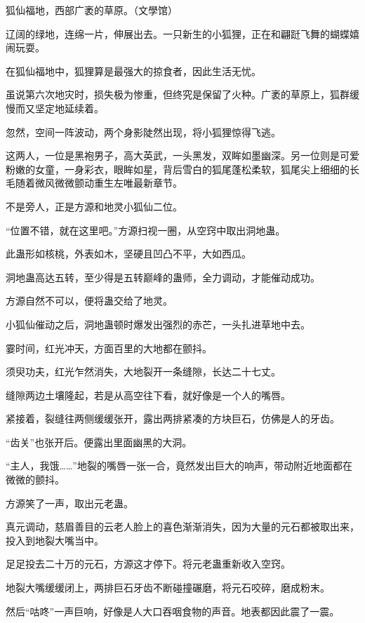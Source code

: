 
\begin{this_body}

狐仙福地，西部广袤的草原。（文學馆）

辽阔的绿地，连绵一片，伸展出去。一只新生的小狐狸，正在和翩跹飞舞的蝴蝶嬉闹玩耍。

在狐仙福地中，狐狸算是最强大的掠食者，因此生活无忧。

虽说第六次地灾时，损失极为惨重，但终究是保留了火种。广袤的草原上，狐群缓慢而又坚定地延续着。

忽然，空间一阵波动，两个身影陡然出现，将小狐狸惊得飞逃。

这两人，一位是黑袍男子，高大英武，一头黑发，双眸如墨幽深。另一位则是可爱粉嫩的女童，一身彩衣，眼眸如星，背后雪白的狐尾蓬松柔软，狐尾尖上细细的长毛随着微风微微颤动重生左唯最新章节。

不是旁人，正是方源和地灵小狐仙二位。

“位置不错，就在这里吧。”方源扫视一圈，从空窍中取出洞地蛊。

此蛊形如核桃，外表如木，坚硬且凹凸不平，大如西瓜。

洞地蛊高达五转，至少得是五转巅峰的蛊师，全力调动，才能催动成功。

方源自然不可以，便将蛊交给了地灵。

小狐仙催动之后，洞地蛊顿时爆发出强烈的赤芒，一头扎进草地中去。

霎时间，红光冲天，方面百里的大地都在颤抖。

须臾功夫，红光乍然消失，大地裂开一条缝隙，长达二十七丈。

缝隙两边土壤隆起，若是从高空往下看，就好像是一个人的嘴唇。

紧接着，裂缝往两侧缓缓张开，露出两排紧凑的方块巨石，仿佛是人的牙齿。

“齿关”也张开后。便露出里面幽黑的大洞。

“主人，我饿……”地裂的嘴唇一张一合，竟然发出巨大的响声，带动附近地面都在微微的颤抖。

方源笑了一声，取出元老蛊。

真元调动，慈眉善目的云老人脸上的喜色渐渐消失，因为大量的元石都被取出来，投入到地裂大嘴当中。

足足投去二十万的元石，方源这才停下。将元老蛊重新收入空窍。

地裂大嘴缓缓闭上，两排巨石牙齿不断碰撞碾磨，将元石咬碎，磨成粉末。

然后“咕咚”一声巨响，好像是人大口吞咽食物的声音。地表都因此震了一震。


\end{this_body}
